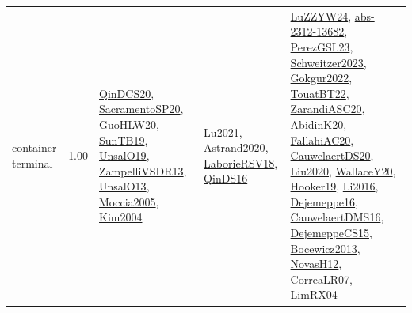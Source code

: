 {\begin{longtable}{p{3cm}r>{\raggedright\arraybackslash}p{6cm}>{\raggedright\arraybackslash}p{6cm}>{\raggedright\arraybackslash}p{8cm}}
\index{container terminal}\index{ApplicationAreas!container terminal}container terminal &  1.00 & \hyperref[detail:QinDCS20]{QinDCS20}, \hyperref[detail:SacramentoSP20]{SacramentoSP20}, \hyperref[detail:GuoHLW20]{GuoHLW20}, \hyperref[detail:SunTB19]{SunTB19}, \hyperref[detail:UnsalO19]{UnsalO19}, \hyperref[detail:ZampelliVSDR13]{ZampelliVSDR13}, \hyperref[detail:UnsalO13]{UnsalO13}, \hyperref[detail:Moccia2005]{Moccia2005}, \hyperref[detail:Kim2004]{Kim2004} & \hyperref[detail:Lu2021]{Lu2021}, \hyperref[detail:Astrand2020]{Astrand2020}, \hyperref[detail:LaborieRSV18]{LaborieRSV18}, \hyperref[detail:QinDS16]{QinDS16} & \hyperref[detail:LuZZYW24]{LuZZYW24}, \hyperref[detail:abs-2312-13682]{abs-2312-13682}, \hyperref[detail:PerezGSL23]{PerezGSL23}, \hyperref[detail:Schweitzer2023]{Schweitzer2023}, \hyperref[detail:Gokgur2022]{Gokgur2022}, \hyperref[detail:TouatBT22]{TouatBT22}, \hyperref[detail:ZarandiASC20]{ZarandiASC20}, \hyperref[detail:AbidinK20]{AbidinK20}, \hyperref[detail:FallahiAC20]{FallahiAC20}, \hyperref[detail:CauwelaertDS20]{CauwelaertDS20}, \hyperref[detail:Liu2020]{Liu2020}, \hyperref[detail:WallaceY20]{WallaceY20}, \hyperref[detail:Hooker19]{Hooker19}, \hyperref[detail:Li2016]{Li2016}, \hyperref[detail:Dejemeppe16]{Dejemeppe16}, \hyperref[detail:CauwelaertDMS16]{CauwelaertDMS16}, \hyperref[detail:DejemeppeCS15]{DejemeppeCS15}, \hyperref[detail:Bocewicz2013]{Bocewicz2013}, \hyperref[detail:NovasH12]{NovasH12}, \hyperref[detail:CorreaLR07]{CorreaLR07}, \hyperref[detail:LimRX04]{LimRX04}\\

\end{longtable}}
